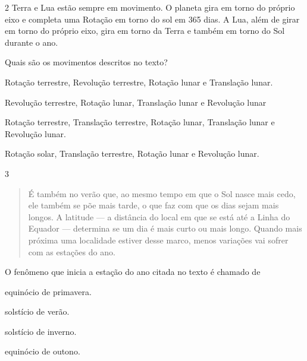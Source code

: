 
\pagebreak
\num{2} Terra e Lua estão sempre em movimento. O planeta gira em
torno do próprio eixo e completa uma Rotação em torno do sol em 365
dias. A Lua, além de girar em torno do próprio eixo, gira em torno da
Terra e também em torno do Sol durante o ano.

Quais são os movimentos descritos no texto?

\begin{escolha}
\item Rotação terrestre, Revolução terrestre, Rotação lunar e Translação lunar.

\item Revolução terrestre, Rotação lunar, Translação lunar e Revolução lunar

\item Rotação terrestre, Translação terrestre, Rotação lunar, Translação lunar e Revolução lunar.

\item Rotação solar, Translação terrestre, Rotação lunar e Revolução lunar.
\end{escolha}


\num{3}

\begin{quote}
É também no verão que, ao mesmo tempo em que o Sol nasce mais cedo, ele
também se põe mais tarde, o que faz com que os dias sejam mais longos. A
latitude — a distância do local em que se está até a Linha do Equador
— determina se um dia é mais curto ou mais longo. Quando mais próxima
uma localidade estiver desse marco, menos variações vai sofrer com as
estações do ano.

\end{quote}

O fenômeno que inicia a estação do ano citada no texto é chamado de

\begin{minipage}{.5\textwidth}
\begin{escolha}
\item equinócio de primavera.

\item solstício de verão.

\item solstício de inverno.

\item equinócio de outono.
\end{escolha}
\end{minipage}



